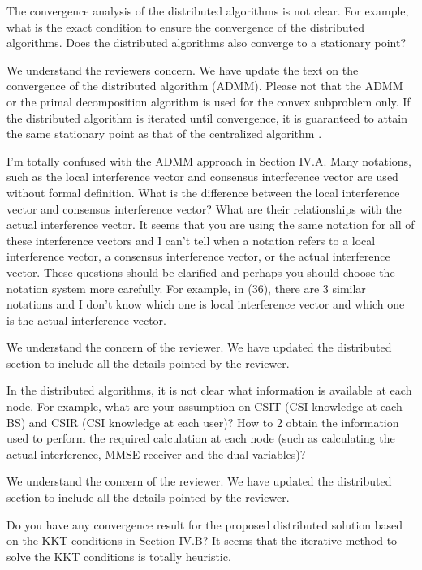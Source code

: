  The convergence analysis of the distributed algorithms is not clear. For example, what is the exact condition to ensure the convergence of the distributed algorithms. Does the distributed algorithms also converge to a stationary point?

\resp We understand the reviewers concern. We have update the text on the convergence of the distributed algorithm (ADMM). Please not that the ADMM or the primal decomposition algorithm is used for the convex subproblem only. If the distributed algorithm is iterated until convergence, it is guaranteed to attain the same stationary point as that of the centralized algorithm \cite{boyd2011distributed}.

 I’m totally confused with the ADMM approach in Section IV.A. Many notations, such as the local interference vector and consensus interference vector are used without formal definition. What is the difference between the local interference vector and consensus interference vector? What are their relationships with the actual interference vector. It seems that you are using the same notation for all of these interference vectors and I can’t tell when a notation refers to a local interference vector, a consensus interference vector, or the actual interference vector. These questions should be clarified and perhaps you should choose the notation system more carefully. For example, in (36), there are 3 similar notations and I don’t know which one is local interference vector and which one is the actual interference vector.

\resp We understand the concern of the reviewer. We have updated the distributed section to include all the details pointed by the reviewer.

 In the distributed algorithms, it is not clear what information is available at each node. For example, what are your assumption on CSIT (CSI knowledge at each BS) and CSIR (CSI knowledge at each user)? How to 2 obtain the information used to perform the required calculation at each node (such as calculating the actual interference, MMSE receiver and the dual variables)?

\resp We understand the concern of the reviewer. We have updated the distributed section to include all the details pointed by the reviewer.

 Do you have any convergence result for the proposed distributed solution based on the KKT conditions in Section IV.B? It seems that the iterative method to solve the KKT conditions is totally heuristic.

